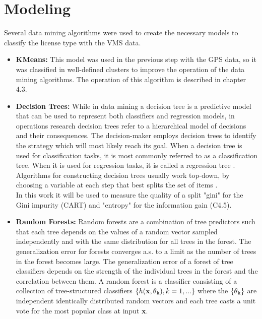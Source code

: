 \section{Modeling} %
\label{sub:modeling}
Several data mining algorithms were used to create the necessary models to classify the license type with the VMS data.
\begin{itemize}
\item \textbf{ KMeans:} This model was used in the previous step with the GPS data, so it was classified in well-defined clusters to improve the operation of the data mining algorithms. The operation of this algorithm is described in chapter 4.3.

\item \textbf{ Decision Trees: }
While in data mining a decision tree is a predictive model that can be used to represent both classifiers and regression models, in operations research decision trees refer to a hierarchical model of decisions and their consequences. The decision-maker employs decision trees to identify the strategy which will most likely reach its goal. When a decision tree is used for classification tasks, it is most commonly referred to as a classification tree. When it is used for regression tasks, it is called a regression tree \cite{Rokach2014}.
Algorithms for constructing decision trees usually work top-down, by choosing a variable at each step that best splits the set of items \cite{ApplicationsReviews}.\\
In this work it will be used to measure the quality of a split "gini" for the Gini impurity (CART)\cite{DTAnalysis} and "entropy" for the information gain (C4.5)\cite{DTAnalysis}.

\item \textbf{ Random Forests: }
Random forests are a combination of tree predictors such that each tree depends on the values of a random vector sampled independently and with the same distribution for all trees in the forest\cite{Breiman2001}. The generalization error for forests converges a.s. to a limit as the number of trees in the forest becomes large. The generalization error of a forest of tree classifiers depends on the strength of the individual trees in the forest and the correlation between them.
A random forest is a classifier consisting of a collection of tree-structured
classifiers \(\{h(\textbf{x}, \theta \textsubscript{k} ), k = 1,...\}\) where the  \( \{ \theta \textsubscript{k} \}\) are independent identically distributed
random vectors and each tree casts a unit vote for the most popular class at input \textbf{x}\cite{Breiman2001}.



\end{itemize}
